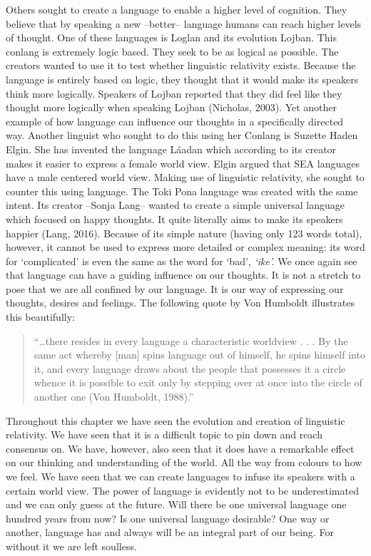  
	Others sought to create a language to enable a higher level of cognition. They believe that by speaking a new --better-- language humans can reach higher levels of thought. One of these languages is Loglan and its evolution Lojban. This conlang is extremely logic based. They seek to be as logical as possible. The creators wanted to use it to test whether linguistic relativity exists. Because the language is entirely based on logic, they thought that it would make its speakers think more logically. Speakers of Lojban reported that they did feel like they thought more logically when speaking Lojban (Nicholas, 2003). Yet another example of how language can influence our thoughts in a specifically directed way. Another linguist who sought to do this using her Conlang is Suzette Haden Elgin. She has invented the language Láadan which according to its creator makes it easier to express a female world view. Elgin argued that SEA languages have a male centered world view. Making use of linguistic relativity, she sought to counter this using language. The Toki Pona language was created with the same intent. Its creator –Sonja Lang– wanted to create a simple universal language which focused on happy thoughts. It quite literally aims to make its speakers happier (Lang, 2016). Because of its simple nature (having only 123 words total), however, it cannot be used to express more detailed or complex meaning: its word for ‘complicated’ is even the same as the word for ‘bad’, \textit{‘ike’.} We once again see that language can have a guiding influence on our thoughts. It is not a stretch to pose that we are all confined by our language. It is our way of expressing our thoughts, desires and feelings. The following quote by Von Humboldt illustrates this beautifully: 

\begin{quote}
\begin{singlespace}
“…there resides in every language a characteristic worldview . . . By the same act whereby [man] spins language out of himself, he spins himself into it, and every language draws about the people that possesses it a circle whence it is possible to exit only by stepping over at once into the circle of another one (Von Humboldt, 1988).”
\end{singlespace}
\end{quote}

\noindent Throughout this chapter we have seen the evolution and creation of linguistic relativity. We have seen that it is a difficult topic to pin down and reach consensus on. We have, however, also seen that it does have a remarkable effect on our thinking and understanding of the world. All the way from colours to how we feel. We have seen that we can create languages to infuse its speakers with a certain world view. The power of language is evidently not to be underestimated and we can only guess at the future. Will there be one universal language one hundred years from now? Is one universal language desirable? One way or another, language has and always will be an integral part of our being. For without it we are left soulless.  

